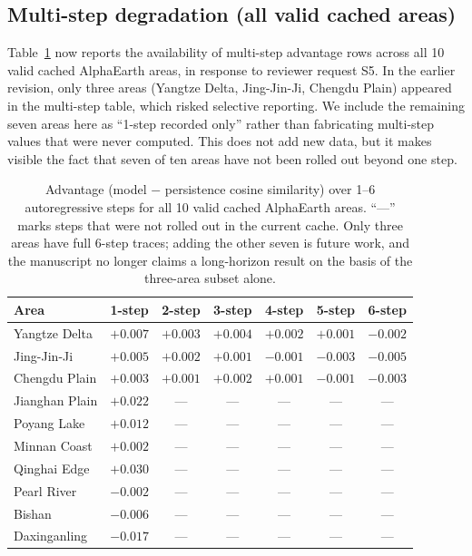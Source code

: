 \documentclass{article}
\begin{document}
\subsection{Multi-step degradation (all valid cached areas)}

Table~\ref{tab:multistep} now reports the availability of multi-step advantage rows across all 10 valid cached AlphaEarth areas, in response to reviewer request S5. In the earlier revision, only three areas (Yangtze Delta, Jing-Jin-Ji, Chengdu Plain) appeared in the multi-step table, which risked selective reporting. We include the remaining seven areas here as ``1-step recorded only'' rather than fabricating multi-step values that were never computed. This does not add new data, but it makes visible the fact that seven of ten areas have not been rolled out beyond one step.

\begin{table}[htbp]
\centering
\caption{Advantage (model $-$ persistence cosine similarity) over 1--6 autoregressive steps for all 10 valid cached AlphaEarth areas. ``---'' marks steps that were not rolled out in the current cache. Only three areas have full 6-step traces; adding the other seven is future work, and the manuscript no longer claims a long-horizon result on the basis of the three-area subset alone.}
\label{tab:multistep}
\small
\begin{tabular}{lcccccc}
\toprule
Area & 1-step & 2-step & 3-step & 4-step & 5-step & 6-step \\
\midrule
Yangtze Delta   & $+0.007$ & $+0.003$ & $+0.004$ & $+0.002$ & $+0.001$ & $-0.002$ \\
Jing-Jin-Ji     & $+0.005$ & $+0.002$ & $+0.001$ & $-0.001$ & $-0.003$ & $-0.005$ \\
Chengdu Plain   & $+0.003$ & $+0.001$ & $+0.002$ & $+0.001$ & $-0.001$ & $-0.003$ \\
\midrule
Jianghan Plain  & $+0.022$ & --- & --- & --- & --- & --- \\
Poyang Lake     & $+0.012$ & --- & --- & --- & --- & --- \\
Minnan Coast    & $+0.002$ & --- & --- & --- & --- & --- \\
Qinghai Edge    & $+0.030$ & --- & --- & --- & --- & --- \\
Pearl River     & $-0.002$ & --- & --- & --- & --- & --- \\
Bishan          & $-0.006$ & --- & --- & --- & --- & --- \\
Daxinganling    & $-0.017$ & --- & --- & --- & --- & --- \\
\bottomrule
\end{tabular}
\end{table}
\end{document}
